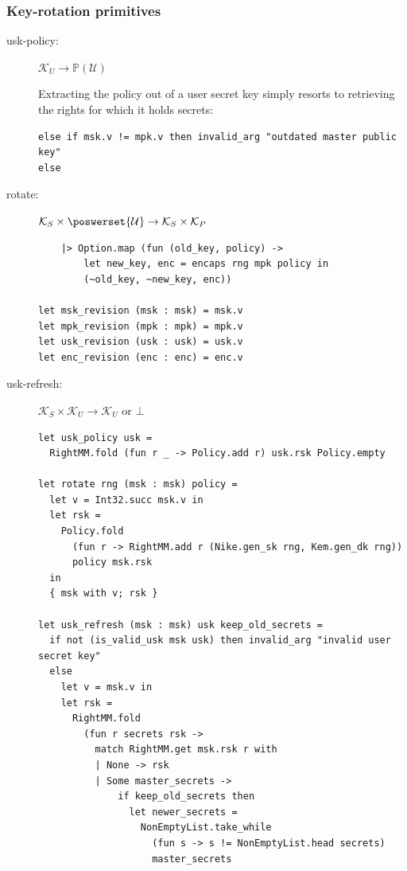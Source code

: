 \documentclass[a4paper]{article}
\theoremstyle{definition}
\newcommand{\powerset}[1]{\mathbb P(#1)}
\newcommand{\cK}{\mathcal{K}}
\newcommand{\cU}{\mathcal{U}}
\begin{document}
\subsubsection{Key-rotation primitives}
\label{sec:orga79161b}

\begin{description}
\item[{usk-policy:}] \(\cK_U \rightarrow \powerset{\cU}\)

Extracting the policy out of a user secret key simply resorts to retrieving
the rights for which it holds secrets:

\begin{verbatim}
else if msk.v != mpk.v then invalid_arg "outdated master public key"
else
\end{verbatim}

\item[{rotate:}] \(\cK_S \times \poswerset{\cU} \rightarrow \cK_S \times \cK_P\)

\begin{verbatim}
    |> Option.map (fun (old_key, policy) ->
        let new_key, enc = encaps rng mpk policy in
        (~old_key, ~new_key, enc))

let msk_revision (msk : msk) = msk.v
let mpk_revision (mpk : mpk) = mpk.v
let usk_revision (usk : usk) = usk.v
let enc_revision (enc : enc) = enc.v
\end{verbatim}

\item[{usk-refresh:}] \(\cK_S \times \cK_U \rightarrow \cK_U\) or \(\bot\)

\begin{verbatim}
let usk_policy usk =
  RightMM.fold (fun r _ -> Policy.add r) usk.rsk Policy.empty

let rotate rng (msk : msk) policy =
  let v = Int32.succ msk.v in
  let rsk =
    Policy.fold
      (fun r -> RightMM.add r (Nike.gen_sk rng, Kem.gen_dk rng))
      policy msk.rsk
  in
  { msk with v; rsk }

let usk_refresh (msk : msk) usk keep_old_secrets =
  if not (is_valid_usk msk usk) then invalid_arg "invalid user secret key"
  else
    let v = msk.v in
    let rsk =
      RightMM.fold
        (fun r secrets rsk ->
          match RightMM.get msk.rsk r with
          | None -> rsk
          | Some master_secrets ->
              if keep_old_secrets then
                let newer_secrets =
                  NonEmptyList.take_while
                    (fun s -> s != NonEmptyList.head secrets)
                    master_secrets
\end{verbatim}


\end{description}
\end{document}
